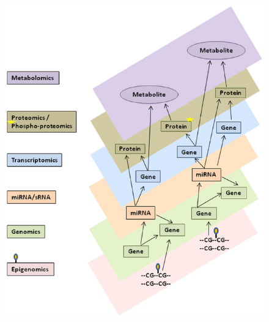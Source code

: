 \documentclass[10pt]{beamer}
\theoremstyle{definition}
\begin{document}
\begin{frame}

\begin{figure}
\centering
\includegraphics[height=.9\textheight]{multi-omics}
\end{figure}

\end{frame}
\end{document}
